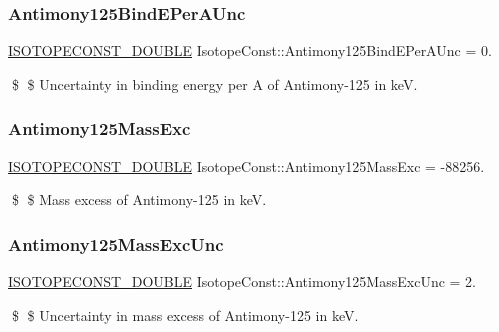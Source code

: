 \subsubsection{\texorpdfstring{Antimony125\+Bind\+E\+Per\+A\+Unc}{Antimony125BindEPerAUnc}}
{\footnotesize\ttfamily \mbox{\hyperlink{group___isotope_const-_macros_ga8f45a7272ce02c0b4c65c44636ed719a}{I\+S\+O\+T\+O\+P\+E\+C\+O\+N\+S\+T\+\_\+\+D\+O\+U\+B\+LE}} Isotope\+Const\+::\+Antimony125\+Bind\+E\+Per\+A\+Unc = 0.}

\$ \$ Uncertainty in binding energy per A of Antimony-\/125 in keV. \mbox{\label{group___isotope_const-_antimony-_sb125_ga2a3865c385888be4966d05fc7faa0d68}} 
\subsubsection{\texorpdfstring{Antimony125\+Mass\+Exc}{Antimony125MassExc}}
{\footnotesize\ttfamily \mbox{\hyperlink{group___isotope_const-_macros_ga8f45a7272ce02c0b4c65c44636ed719a}{I\+S\+O\+T\+O\+P\+E\+C\+O\+N\+S\+T\+\_\+\+D\+O\+U\+B\+LE}} Isotope\+Const\+::\+Antimony125\+Mass\+Exc = -\/88256.}

\$ \$ Mass excess of Antimony-\/125 in keV. \mbox{\label{group___isotope_const-_antimony-_sb125_gafbd5416f8a58d7f6b88e2828ae94f6d4}} 
\subsubsection{\texorpdfstring{Antimony125\+Mass\+Exc\+Unc}{Antimony125MassExcUnc}}
{\footnotesize\ttfamily \mbox{\hyperlink{group___isotope_const-_macros_ga8f45a7272ce02c0b4c65c44636ed719a}{I\+S\+O\+T\+O\+P\+E\+C\+O\+N\+S\+T\+\_\+\+D\+O\+U\+B\+LE}} Isotope\+Const\+::\+Antimony125\+Mass\+Exc\+Unc = 2.}

\$ \$ Uncertainty in mass excess of Antimony-\/125 in keV. \mbox{\label{group___isotope_const-_antimony-_sb125_gadcf20979992a2ba3b0358252e4300e6a}} 
